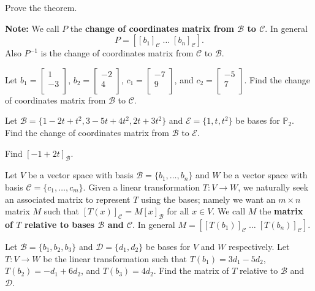 \documentclass[12pt,letterpaper]{article}
\begin{document}
\begin{enumerate}
\Problem Prove the theorem.

\vfill

\newpage

{\bf Note:} We call $P$ the {\bf change of coordinates matrix from $\mathcal{B}$ to $\mathcal{C}$}. In general $$P= [[b_1]_\mathcal{C} \; \dots \; [b_n]_\mathcal{C}].$$ Also $P^{-1}$ is the change of coordinates matrix from $\mathcal{C}$ to $\mathcal{B}$.

\Problem Let $b_1=\begin{bmatrix} 1\\ -3\\ \end{bmatrix}$, $b_2=\begin{bmatrix} -2\\ 4\\ \end{bmatrix}$, $c_1=\begin{bmatrix} -7\\ 9\\ \end{bmatrix}$, and $c_2=\begin{bmatrix} -5\\ 7\\ \end{bmatrix}$. Find the change of coordinates matrix from $\mathcal{B}$ to $\mathcal{C}$.

\vfill

\Problem Let $\mathcal{B}=\{1-2t+t^2, 3-5t+4t^2,2t+3t^2\}$ and $\mathcal{E}=\{1, t, t^2\}$ be bases for $\mathbb{P}_2$. Find the change of coordinates matrix from $\mathcal{B}$ to $\mathcal{E}$.

\vfill

\Problem Find $[-1+2t]_\mathcal{B}$.

\vfill

\newpage

Let $V$ be a vector space with basis $\mathcal{B}=\{b_1, \dots, b_n\}$ and $W$ be a vector space with basis $\mathcal{C}=\{c_1, \dots, c_m\}$. Given a linear transformation $T: V\to W$, we naturally seek an associated matrix to represent $T$ using the bases; namely we want an $m\times n$ matrix $M$ such that $[T(x)]_\mathcal{C}=M [x]_\mathcal{B}$ for all $x \in V$. We call $M$ the {\bf matrix of $T$ relative to bases $\mathcal{B}$ and $\mathcal{C}$}. In general $M= [[T(b_1)]_\mathcal{C} \; \dots \; [T(b_n)]_\mathcal{C}]$.

\Problem Let $\mathcal{B}=\{b_1, b_2, b_3\}$ and $\mathcal{D}=\{d_1, d_2\}$ be bases for $V$ and $W$ respectively. Let $T: V \to W$ be the linear transformation such that $T(b_1)=3d_1-5d_2$, $T(b_2)=-d_1+6d_2$, and $T(b_3)=4d_2$. Find the matrix of $T$ relative to $\mathcal{B}$ and $\mathcal{D}$.

\vfill


\end{enumerate}
\end{document}
